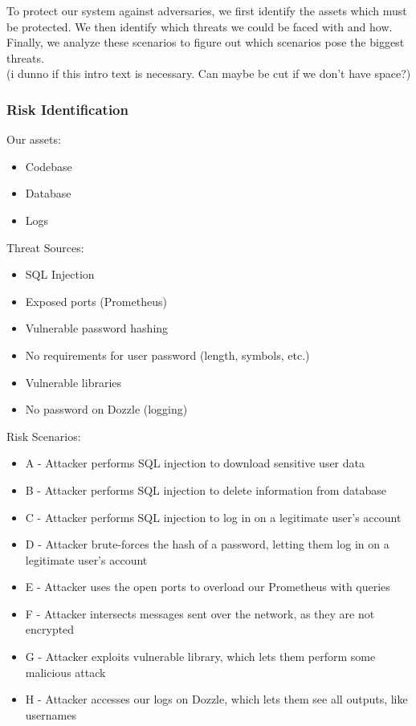 To protect our system against adversaries, we first identify the assets which must be protected. We then identify which threats we could be faced with and how. Finally, we analyze these scenarios to figure out which scenarios pose the biggest threats.\\
(i dunno if this intro text is necessary. Can maybe be cut if we don't have space?)

\subsubsection{Risk Identification}
Our assets:
\begin{itemize}
    \item Codebase
    \item Database
    \item Logs
\end{itemize}

Threat Sources:
\begin{itemize}
    \item SQL Injection
    \item Exposed ports (Prometheus)
    \item Vulnerable password hashing
    \item No requirements for user password (length, symbols, etc.)
    \item Vulnerable libraries
    \item No password on Dozzle (logging)
\end{itemize}

Risk Scenarios:
\begin{itemize}
    \item A - Attacker performs SQL injection to download sensitive user data
    \item B - Attacker performs SQL injection to delete information from database
    \item C - Attacker performs SQL injection to log in on a legitimate user's account
    \item D - Attacker brute-forces the hash of a password, letting them log in on a legitimate user's account
    \item E - Attacker uses the open ports to overload our Prometheus with queries
    \item F - Attacker intersects messages sent over the network, as they are not encrypted
    \item G - Attacker exploits vulnerable library, which lets them perform some malicious attack
    \item H - Attacker accesses our logs on Dozzle, which lets them see all outputs, like usernames
\end{itemize}

